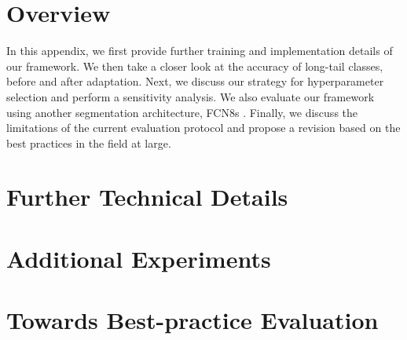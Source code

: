 \documentclass[final]{cvpr}
\begin{document}
\maketitle

\section{Overview}
In this appendix, we first provide further training and implementation details of our framework.
We then take a closer look at the accuracy of long-tail classes, before and after adaptation.
Next, we discuss our strategy for hyperparameter selection and perform a sensitivity analysis.
We also evaluate our framework using another segmentation architecture, FCN8s .
Finally, we discuss the limitations of the current evaluation protocol and propose a revision based on the best practices in the field at large.

\section{Further Technical Details}
\label{sec:supp_impl}


\section{Additional Experiments}
\label{sec:supp_class}


\section{Towards Best-practice Evaluation}
\label{sec:supp_eval}


{\small
{}
}
\end{document}

